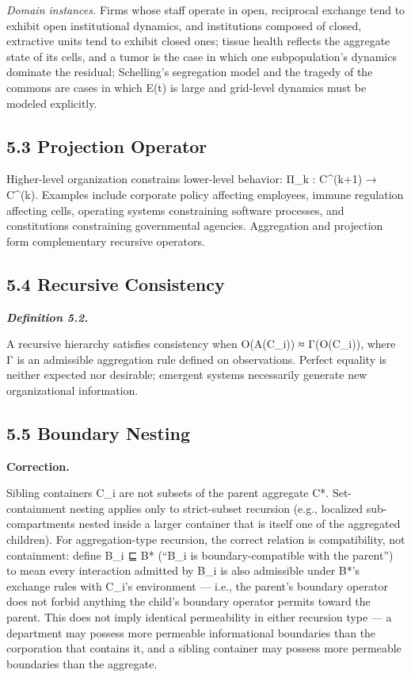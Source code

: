 \documentclass[
]{article}
\begin{document}
\emph{Domain instances.} Firms whose staff operate in open, reciprocal
exchange tend to exhibit open institutional dynamics, and institutions
composed of closed, extractive units tend to exhibit closed ones; tissue
health reflects the aggregate state of its cells, and a tumor is the
case in which one subpopulation's dynamics dominate the residual;
Schelling's segregation model and the tragedy of the commons are cases
in which E(t) is large and grid-level dynamics must be modeled
explicitly.

\hypertarget{projection-operator}{%
\subsection{5.3 Projection Operator}\label{projection-operator}}

Higher-level organization constrains lower-level behavior: Π\_k :
C\^{}(k+1) → C\^{}(k). Examples include corporate policy affecting
employees, immune regulation affecting cells, operating systems
constraining software processes, and constitutions constraining
governmental agencies. Aggregation and projection form complementary
recursive operators.

\hypertarget{recursive-consistency}{%
\subsection{5.4 Recursive Consistency}\label{recursive-consistency}}

\emph{\textbf{Definition 5.2.}}

A recursive hierarchy satisfies consistency when O(A(C\_i)) ≈
Γ(O(C\_i)), where Γ is an admissible aggregation rule defined on
observations. Perfect equality is neither expected nor desirable;
emergent systems necessarily generate new organizational information.

\hypertarget{boundary-nesting}{%
\subsection{5.5 Boundary Nesting}\label{boundary-nesting}}

\textbf{Correction.}

Sibling containers C\_i are not subsets of the parent aggregate C*.
Set-containment nesting applies only to strict-subset recursion (e.g.,
localized sub-compartments nested inside a larger container that is
itself one of the aggregated children). For aggregation-type recursion,
the correct relation is compatibility, not containment: define B\_i ⊑ B*
(``B\_i is boundary-compatible with the parent'') to mean every
interaction admitted by B\_i is also admissible under B*'s exchange
rules with C\_i's environment --- i.e., the parent's boundary operator
does not forbid anything the child's boundary operator permits toward
the parent. This does not imply identical permeability in either
recursion type --- a department may possess more permeable informational
boundaries than the corporation that contains it, and a sibling
container may possess more permeable boundaries than the aggregate.
\end{document}
